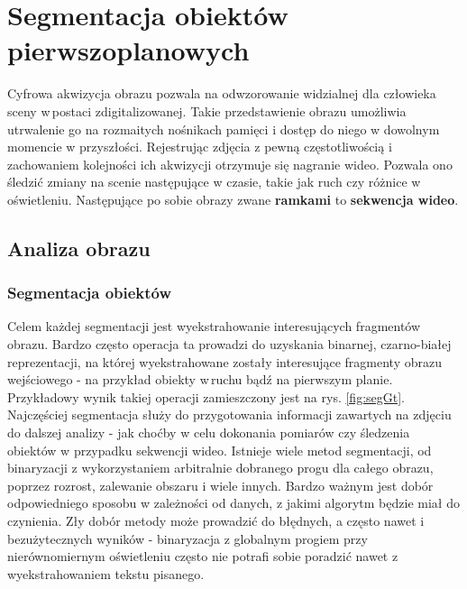 \chapter{Segmentacja obiektów pierwszoplanowych}
\label{cha:tematykaPracy}
Cyfrowa akwizycja obrazu pozwala na odwzorowanie widzialnej dla człowieka sceny w\,postaci zdigitalizowanej. Takie przedstawienie obrazu umożliwia utrwalenie go na rozmaitych nośnikach pamięci i dostęp do niego w dowolnym momencie w przyszłości. Rejestrując zdjęcia z pewną częstotliwością i zachowaniem kolejności ich akwizycji otrzymuje się nagranie wideo. Pozwala ono śledzić zmiany na scenie następujące w czasie, takie jak ruch czy różnice w oświetleniu. Następujące po sobie obrazy zwane \textbf{ramkami} to \textbf{sekwencja wideo}.

\section{Analiza obrazu}  
\subsection{Segmentacja obiektów}
Celem każdej segmentacji jest wyekstrahowanie interesujących fragmentów obrazu. Bardzo często operacja ta prowadzi do uzyskania binarnej, czarno-białej reprezentacji, na której wyekstrahowane zostały interesujące fragmenty obrazu wejściowego - na przykład obiekty w\,ruchu bądź na pierwszym planie. Przykładowy wynik takiej operacji zamieszczony jest na rys. \ref{fig:segGt}. Najczęściej segmentacja służy do przygotowania informacji zawartych na zdjęciu do dalszej analizy - jak choćby w celu dokonania pomiarów czy śledzenia obiektów w przypadku sekwencji wideo. Istnieje wiele metod segmentacji, od binaryzacji z wykorzystaniem arbitralnie dobranego progu dla całego obrazu, poprzez rozrost, zalewanie obszaru i wiele innych. Bardzo ważnym jest dobór odpowiedniego sposobu w zależności od danych, z jakimi algorytm będzie miał do czynienia. Zły dobór metody może prowadzić do błędnych, a często nawet i bezużytecznych wyników - binaryzacja z globalnym progiem przy nierównomiernym oświetleniu często nie potrafi sobie poradzić nawet z wyekstrahowaniem tekstu pisanego.

